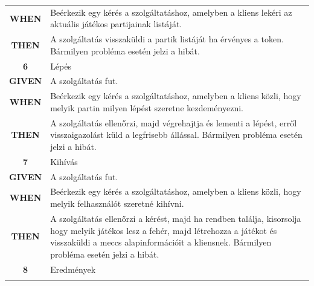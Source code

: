 \documentclass[twoside, a4paper, 12pt]{book}
\begin{document}
\begin{longtable}[c]{|c|p{14cm}|}
	\textbf{WHEN} &
	Beérkezik egy kérés a szolgáltatáshoz, amelyben a kliens lekéri az aktuális játékos partijainak listáját.
	\\
	\nobreakhline
	
	\textbf{THEN} &
	A szolgáltatás visszaküldi a partik listáját ha érvényes a token.
	Bármilyen probléma esetén jelzi a hibát.
	\\
	\hline
	
	
	\rowcolor[HTML]{CBCEFB} 
	\textbf{6}
	&	Lépés
	\\ \nobreakhline
	
	\textbf{GIVEN} &
	A szolgáltatás fut.
	\\ \nobreakhline
	
	\textbf{WHEN} &
	Beérkezik egy kérés a szolgáltatáshoz, amelyben a kliens közli, hogy melyik partin milyen lépést szeretne kezdeményezni.
	\\
	\nobreakhline
	
	\textbf{THEN} &
	A szolgáltatás ellenőrzi, majd végrehajtja és lementi a lépést, erről visszaigazolást küld a legfrisebb állással.
	Bármilyen probléma esetén jelzi a hibát.
	\\
	\hline
	
	
	\rowcolor[HTML]{CBCEFB} 
	\textbf{7}
	&	Kihívás
	\\ \nobreakhline
	
	\textbf{GIVEN} &
	A szolgáltatás fut.
	\\ \nobreakhline
	
	\textbf{WHEN} &
	Beérkezik egy kérés a szolgáltatáshoz, amelyben a kliens közli, hogy melyik felhasználót szeretné kihívni.
	\\
	\nobreakhline
	
	\textbf{THEN} &
	A szolgáltatás ellenőrzi a kérést, majd ha rendben találja, kisorsolja hogy melyik játékos lesz a fehér, majd létrehozza a játékot és visszaküldi a meccs alapinformációit a kliensnek.
	Bármilyen probléma esetén jelzi a hibát.
	\\
	\hline
	
	
	\rowcolor[HTML]{CBCEFB} 
	\textbf{8}
	&	Eredmények
	\\ \nobreakhline
	

\end{longtable}
\end{document}
